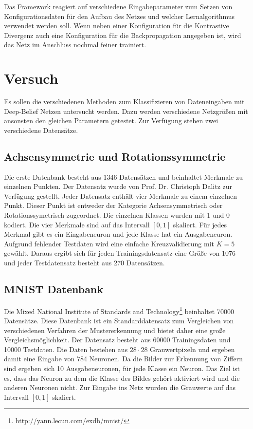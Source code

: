 \documentclass[12pt]{article}
\begin{document}
Das Framework reagiert auf verschiedene Eingabeparameter zum Setzen von Konfigurationsdaten für den Aufbau des Netzes und welcher Lernalgorithmus verwendet werden soll. Wenn neben einer Konfiguration für die Kontrastive Divergenz auch eine Konfiguration für die Backpropagation angegeben ist, wird das Netz im Anschluss nochmal feiner trainiert.

\section{Versuch}
Es sollen die verschiedenen Methoden zum Klassifizieren von Dateneingaben mit Deep-Belief Netzen untersucht werden. Dazu werden verschiedene Netzgrößen mit ansonsten den gleichen Parametern getestet. Zur Verfügung stehen zwei verschiedene Datensätze.
\subsection{Achsensymmetrie und Rotationssymmetrie}
Die erste Datenbank besteht aus 1346 Datensätzen und beinhaltet Merkmale zu einzelnen Punkten. Der Datensatz wurde von  Prof. Dr. Christoph Dalitz zur Verfügung gestellt. Jeder Datensatz enthält vier Merkmale zu einem einzelnen Punkt. Dieser Punkt ist entweder der Kategorie Achsensymmetrisch oder Rotationssymetrisch zugeordnet. Die einzelnen Klassen wurden mit 1 und 0 kodiert. Die vier Merkmale sind auf das Intervall $[0,1]$ skaliert. Für jedes Merkmal gibt es ein Eingabeneuron und jede Klasse hat ein Ausgabeneuron. Aufgrund fehlender Testdaten wird eine einfache Kreuzvalidierung mit $K=5$ gewählt.  Daraus ergibt sich für jeden Trainingsdatensatz eine Größe von 1076 und jeder Testdatensatz besteht aus 270 Datensätzen.

\subsection{MNIST Datenbank}
Die Mixed National Institute of Standards and Technology\footnote{http://yann.lecun.com/exdb/mnist/} beinhaltet 70000 Datensätze. Diese Datenbank ist ein Standarddatensatz zum Vergleichen von verschiedenen Verfahren der Mustererkennung und bietet daher eine große Vergleichsmöglichkeit. Der Datensatz besteht aus 60000 Trainingsdaten und 10000 Testdaten. Die Daten bestehen aus $28 \cdot 28$ Grauwertpixeln und ergeben damit eine Eingabe von 784 Neuronen. Da die Bilder zur Erkennung von Ziffern sind ergeben sich 10 Ausgabeneuronen, für jede Klasse ein Neuron. Das Ziel ist es, dass das Neuron zu dem die Klasse des Bildes gehört aktiviert wird und die anderen Neuronen nicht. Zur Eingabe ins Netz wurden die Grauwerte auf das Intervall $[0,1]$ skaliert.
\end{document}
